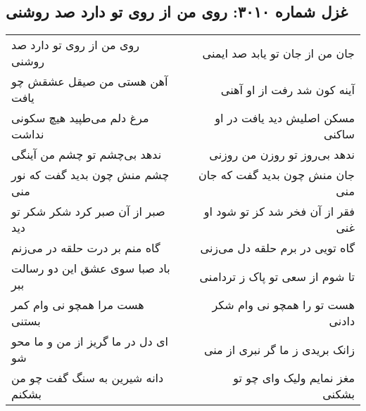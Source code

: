\begin{center}
\section*{غزل شماره ۳۰۱۰: روی من از روی تو دارد صد روشنی}
\label{sec:3010}
\begin{longtable}{l p{0.5cm} r}
روی من از روی تو دارد صد روشنی
&&
جان من از جان تو یابد صد ایمنی
\\
آهن هستی من صیقل عشقش چو یافت
&&
آینه کون شد رفت از او آهنی
\\
مرغ دلم می‌طپید هیچ سکونی نداشت
&&
مسکن اصلیش دید یافت در او ساکنی
\\
ندهد بی‌چشم تو چشم من آینگی
&&
ندهد بی‌روز تو روزن من روزنی
\\
چشم منش چون بدید گفت که نور منی
&&
جان منش چون بدید گفت که جان منی
\\
صبر از آن صبر کرد شکر شکر تو دید
&&
فقر از آن فخر شد کز تو شود او غنی
\\
گاه منم بر درت حلقه در می‌زنم
&&
گاه تویی در برم حلقه دل می‌زنی
\\
باد صبا سوی عشق این دو رسالت ببر
&&
تا شوم از سعی تو پاک ز تردامنی
\\
هست مرا همچو نی وام کمر بستنی
&&
هست تو را همچو نی وام شکر دادنی
\\
ای دل در ما گریز از من و ما محو شو
&&
زانک بریدی ز ما گر نبری از منی
\\
دانه شیرین به سنگ گفت چو من بشکنم
&&
مغز نمایم ولیک وای چو تو بشکنی
\\
\end{longtable}
\end{center}
